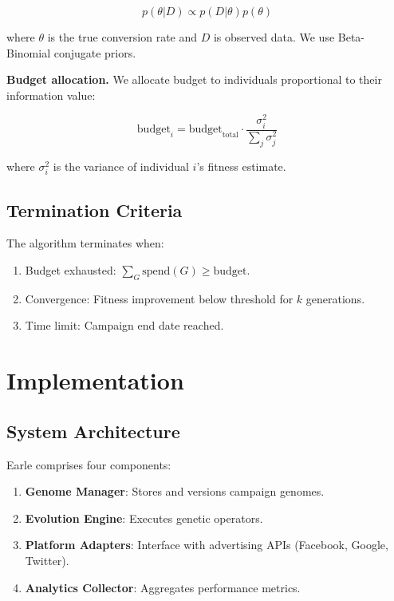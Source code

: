 \documentclass[11pt,twocolumn]{article}
\begin{document}
\begin{equation}
p(\theta | D) \propto p(D | \theta) p(\theta)
\end{equation}

where $\theta$ is the true conversion rate and $D$ is observed data. We use Beta-Binomial conjugate priors.

\textbf{Budget allocation.} We allocate budget to individuals proportional to their information value:

\begin{equation}
\text{budget}_i = \text{budget}_{\text{total}} \cdot \frac{\sigma_i^2}{\sum_j \sigma_j^2}
\end{equation}

where $\sigma_i^2$ is the variance of individual $i$'s fitness estimate.

\subsection{Termination Criteria}

The algorithm terminates when:

\begin{enumerate}
\item Budget exhausted: $\sum_G \text{spend}(G) \geq \text{budget}$.
\item Convergence: Fitness improvement below threshold for $k$ generations.
\item Time limit: Campaign end date reached.
\end{enumerate}

\section{Implementation}

\subsection{System Architecture}

Earle comprises four components:

\begin{enumerate}
\item \textbf{Genome Manager}: Stores and versions campaign genomes.
\item \textbf{Evolution Engine}: Executes genetic operators.
\item \textbf{Platform Adapters}: Interface with advertising APIs (Facebook, Google, Twitter).
\item \textbf{Analytics Collector}: Aggregates performance metrics.
\end{enumerate}
\end{document}
